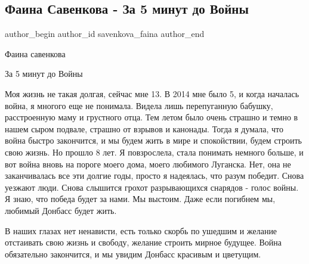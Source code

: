  
 
 
 
 
 
\subsection{Фаина Савенкова - За 5 минут до Войны}
\label{sec:19_02_2022.fb.savenkova_faina.1.za_pjat_minut_do_vojny}
 
\ifcmt
 author_begin
   author_id savenkova_faina
 author_end
\fi

Фаина савенкова

За 5 минут до Войны


Моя жизнь не такая долгая, сейчас мне 13. В 2014 мне было 5, и когда началась
война, я многого еще не понимала. Видела лишь перепуганную бабушку,
расстроенную маму и грустного отца. Тем летом было очень страшно и темно в
нашем сыром подвале, страшно от взрывов и канонады. Тогда я думала, что война
быстро закончится, и мы будем жить в мире и спокойствии, будем строить свою
жизнь. Но прошло 8 лет. Я повзрослела, стала понимать немного больше, и вот
война вновь на пороге моего дома, моего любимого Луганска. Нет, она не
заканчивалась все эти долгие годы, просто я надеялась, что разум победит. Снова
уезжают люди. Снова слышится грохот разрывающихся снарядов - голос войны. Я
знаю, что победа будет за нами. Мы выстоим. Даже если погибнем мы, любимый
Донбасс будет жить. 

В наших глазах нет ненависти, есть только скорбь по ушедшим и желание
отстаивать свою жизнь и свободу, желание строить мирное будущее. Война
обязательно закончится, и мы увидим Донбасс красивым и цветущим.
